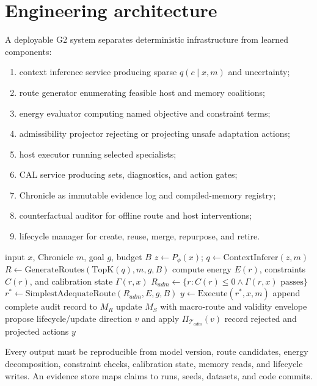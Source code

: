 \documentclass[11pt,a4paper]{article}
\begin{document}
\section{Engineering architecture}
A deployable G2 system separates deterministic infrastructure from learned components:
\begin{enumerate}
\item context inference service producing sparse $q(c\mid x,m)$ and uncertainty;
\item route generator enumerating feasible host and memory coalitions;
\item energy evaluator computing named objective and constraint terms;
\item admissibility projector rejecting or projecting unsafe adaptation actions;
\item host executor running selected specialists;
\item CAL service producing sets, diagnostics, and action gates;
\item Chronicle as immutable evidence log and compiled-memory registry;
\item counterfactual auditor for offline route and host interventions;
\item lifecycle manager for create, reuse, merge, repurpose, and retire.
\end{enumerate}

\begin{algorithm}[ht]
\caption{Minimal G2 route and adaptation loop}
\begin{algorithmic}[1]
\Require input $x$, Chronicle $m$, goal $g$, budget $B$
\State $z\gets P_\phi(x)$; $q\gets\mathrm{ContextInferer}(z,m)$
\State $R\gets\mathrm{GenerateRoutes}(\mathrm{TopK}(q),m,g,B)$
\State compute energy $E(r)$, constraints $C(r)$, and calibration state $\Gamma(r,x)$
\EndFor
\State $R_{adm}\gets\{r:C(r)\le0\land\Gamma(r,x)\text{ passes}\}$
\State $r^*\gets\mathrm{SimplestAdequateRoute}(R_{adm},E,g,B)$
\State $y\gets\mathrm{Execute}(r^*,x,m)$
\State append complete audit record to $M_R$
 update $M_S$ with macro-route and validity envelope \EndIf
\State propose lifecycle/update direction $v$ and apply $\Pi_{\mathcal{T}_{adm}}(v)$
\State record rejected and projected actions
\State \Return $y$
\end{algorithmic}
\end{algorithm}

Every output must be reproducible from model version, route candidates, energy decomposition, constraint checks, calibration state, memory reads, and lifecycle writes. An evidence store maps claims to runs, seeds, datasets, and code commits.
\end{document}
